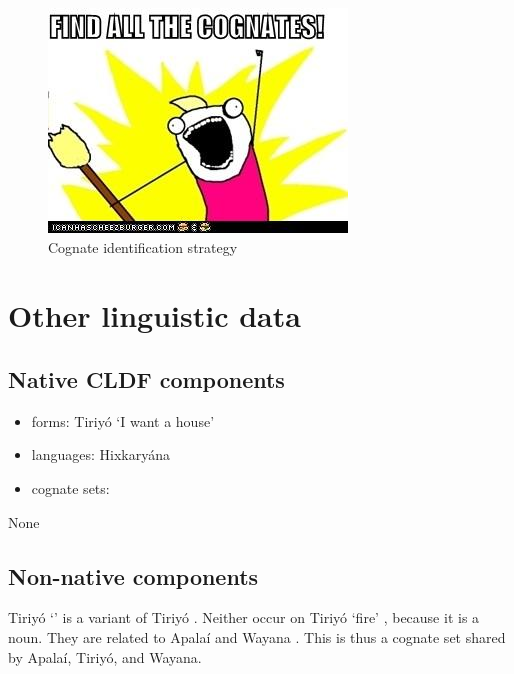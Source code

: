 \documentclass{memoir}
\begin{document}
\begin{figure}
\centering
\includegraphics{figures/cognates.jpg}
\caption{Cognate identification strategy\label{fig:cognates}}
\end{figure}

\chapter{\texorpdfstring{Other linguistic data
\label{sec:data}}{Other linguistic data }}

\section{\texorpdfstring{Native CLDF
components\label{native-cldf-components}}{Native CLDF components}}

\begin{itemize}
\tightlist
\item
  forms: Tiriyó  `I want a house'
  \parencites[417]{triomeira1999}
\item
  languages: Hixkaryána
\item
  cognate sets:
\end{itemize}

None

\section{\texorpdfstring{Non-native
components\label{non-native-components}}{Non-native components}}

Tiriyó  `' \parencites[327]{triomeira1999} is a variant
of Tiriyó  \parencites[327]{triomeira1999}. Neither occur on
Tiriyó  `fire' \parencites[314]{triomeira1999}, because it is
a noun. They are related to Apalaí 
\parencites[77]{koehn1986apalai} and Wayana 
\parencites[236]{wayanatavares2005}. This is thus a cognate set shared
by Apalaí, Tiriyó, and Wayana.
\end{document}

